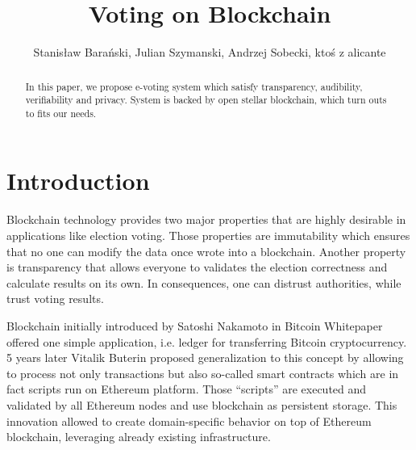 \documentclass[runningheads]{llncs}
\begin{document}
%
\title{Voting on Blockchain}
%
%
\author{Stanisław Barański, Julian Szymanski, Andrzej Sobecki, ktoś z alicante}

%
%
\maketitle              %
%
\begin{abstract}
In this paper, we propose e-voting system which satisfy transparency, audibility, verifiability and privacy. System is backed by open stellar blockchain, which turn outs to fits our needs.


\end{abstract}


\section{Introduction}
 Blockchain technology provides two major properties that are highly desirable in applications like election voting. Those properties are immutability which ensures that no one can modify the data once wrote into a blockchain. Another property is transparency that allows everyone to validates the election correctness and calculate results on its own. In consequences, one can distrust authorities, while trust voting results. 

Blockchain initially introduced by Satoshi Nakamoto in Bitcoin Whitepaper offered one simple application, i.e. ledger for transferring Bitcoin cryptocurrency. 5 years later Vitalik Buterin proposed generalization to this concept by allowing to process not only transactions but also so-called smart contracts which are in fact scripts run on Ethereum platform. Those “scripts” are executed and validated by all Ethereum nodes and use blockchain as persistent storage. This innovation allowed to create domain-specific behavior on top of Ethereum blockchain, leveraging already existing infrastructure.
\end{document}
